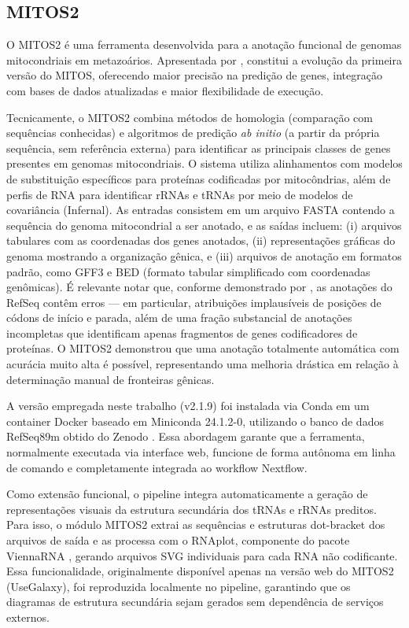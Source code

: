 \subsection{MITOS2}

O MITOS2 é uma ferramenta desenvolvida para a anotação funcional de genomas mitocondriais em metazoários. Apresentada por , constitui a evolução da primeira versão do MITOS, oferecendo maior precisão na predição de genes, integração com bases de dados atualizadas e maior flexibilidade de execução.

Tecnicamente, o MITOS2 combina métodos de homologia (comparação com sequências conhecidas) e algoritmos de predição \textit{ab initio} (a partir da própria sequência, sem referência externa) para identificar as principais classes de genes presentes em genomas mitocondriais. O sistema utiliza alinhamentos com modelos de substituição específicos para proteínas codificadas por mitocôndrias, além de perfis de RNA para identificar rRNAs e tRNAs por meio de modelos de covariância (Infernal). As entradas consistem em um arquivo FASTA contendo a sequência do genoma mitocondrial a ser anotado, e as saídas incluem: (i) arquivos tabulares com as coordenadas dos genes anotados, (ii) representações gráficas do genoma mostrando a organização gênica, e (iii) arquivos de anotação em formatos padrão, como GFF3 e BED (formato tabular simplificado com coordenadas genômicas). É relevante notar que, conforme demonstrado por , as anotações do RefSeq contêm erros --- em particular, atribuições implausíveis de posições de códons de início e parada, além de uma fração substancial de anotações incompletas que identificam apenas fragmentos de genes codificadores de proteínas. O MITOS2 demonstrou que uma anotação totalmente automática com acurácia muito alta é possível, representando uma melhoria drástica em relação à determinação manual de fronteiras gênicas.

A versão empregada neste trabalho (v2.1.9) foi instalada via Conda em um container Docker baseado em Miniconda 24.1.2-0, utilizando o banco de dados RefSeq89m obtido do Zenodo \cite{donath2019}. Essa abordagem garante que a ferramenta, normalmente executada via interface web, funcione de forma autônoma em linha de comando e completamente integrada ao workflow Nextflow.

Como extensão funcional, o pipeline integra automaticamente a geração de representações visuais da estrutura secundária dos tRNAs e rRNAs preditos. Para isso, o módulo MITOS2 extrai as sequências e estruturas dot-bracket dos arquivos de saída e as processa com o RNAplot, componente do pacote ViennaRNA \cite{lorenz2011}, gerando arquivos SVG individuais para cada RNA não codificante. Essa funcionalidade, originalmente disponível apenas na versão web do MITOS2 (UseGalaxy), foi reproduzida localmente no pipeline, garantindo que os diagramas de estrutura secundária sejam gerados sem dependência de serviços externos.

